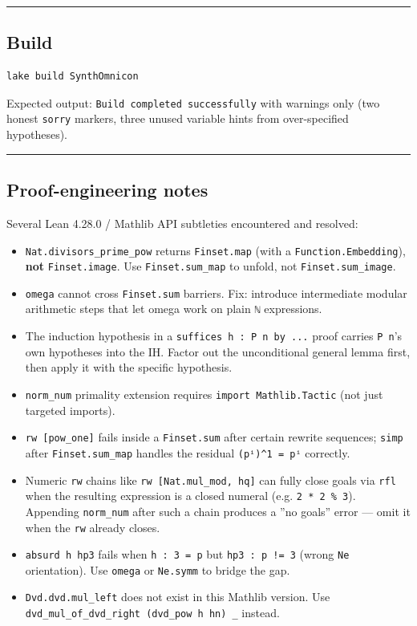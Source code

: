 \documentclass[12pt,a4paper]{article}
\begin{document}
\begin{center}
\rule{0.5\textwidth}{0.4pt}
\end{center}

\subsection{Build}

\begin{lstlisting}[language=bash]
lake build SynthOmnicon
\end{lstlisting}

Expected output: \texttt{Build completed successfully} with warnings only (two honest \texttt{sorry} markers,
three unused variable hints from over-specified hypotheses).

\begin{center}
\rule{0.5\textwidth}{0.4pt}
\end{center}

\subsection{Proof-engineering notes}

Several Lean 4.28.0 / Mathlib API subtleties encountered and resolved:

\begin{itemize}
    \item \texttt{Nat.divisors\_prime\_pow} returns \texttt{Finset.map} (with a \texttt{Function.Embedding}), \textbf{not}
\texttt{Finset.image}. Use \texttt{Finset.sum\_map} to unfold, not \texttt{Finset.sum\_image}.
    \item \texttt{omega} cannot cross \texttt{Finset.sum} barriers. Fix: introduce intermediate modular arithmetic
steps that let omega work on plain \texttt{ℕ} expressions.
    \item The induction hypothesis in a \texttt{suffices h : P n by ...} proof carries \texttt{P n}'s
own hypotheses into the IH. Factor out the unconditional general lemma first, then
apply it with the specific hypothesis.
    \item \texttt{norm\_num} primality extension requires \texttt{import Mathlib.Tactic} (not just targeted imports).
    \item \texttt{rw {[}pow\_one{]}} fails inside a \texttt{Finset.sum} after certain rewrite sequences; \texttt{simp} after
\texttt{Finset.sum\_map} handles the residual \texttt{(pⁱ)\^{}1 = pⁱ} correctly.
    \item Numeric \texttt{rw} chains like \texttt{rw {[}Nat.mul\_mod, hq{]}} can fully close goals via \texttt{rfl} when
the resulting expression is a closed numeral (e.g. \texttt{2 * 2 \% 3}). Appending \texttt{norm\_num}
after such a chain produces a ''no goals'' error --- omit it when the \texttt{rw} already closes.
    \item \texttt{absurd h hp3} fails when \texttt{h : 3 = p} but \texttt{hp3 : p != 3} (wrong \texttt{Ne} orientation).
Use \texttt{omega} or \texttt{Ne.symm} to bridge the gap.
    \item \texttt{Dvd.dvd.mul\_left} does not exist in this Mathlib version. Use
\texttt{dvd\_mul\_of\_dvd\_right (dvd\_pow h hn) \_} instead.
\end{itemize}
\end{document}
